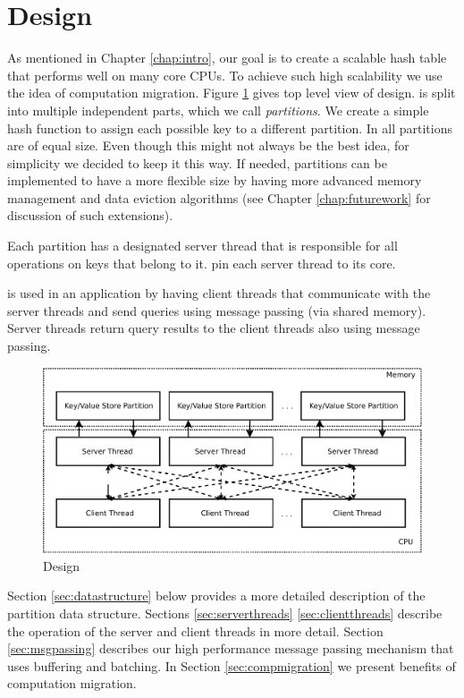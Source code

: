 \section{\cphash{} Design}
\label{chap:mcstore}

As mentioned in Chapter \ref{chap:intro}, our goal is to create a scalable hash table 
that performs well on many core CPUs. To achieve such high scalability we use the idea of 
computation migration. Figure \ref{fig:mcstore} gives top level view of \cphash{} design. 
\cphash{} is split into multiple independent parts, which we call \textit{partitions}. We create a simple 
hash function to assign each possible key to a different partition. In \cphash{} all partitions are of equal size. Even though 
this might not always be the best idea, for simplicity we decided to keep it this way. 
If needed, partitions can be implemented to have a more flexible size by having more advanced 
memory management and data eviction algorithms (see Chapter \ref{chap:futurework} for discussion of such extensions).

Each partition has a designated server thread that is responsible for all operations 
on keys that belong to it. \cphash{} pin each server thread to its core.

\cphash{} is used in an application by having client threads that communicate with the server threads
and send queries using message passing (via shared memory). Server threads return query results
to the client threads also using message passing.  

\begin{figure}[!ht]
  \centering
  \includegraphics[width=\linewidth]{figs/mcstore.pdf}
  \caption{\cphash{} Design}
  \label{fig:mcstore}
\end{figure}

  
Section \ref{sec:datastructure} below provides a more detailed description of the partition data structure. 
Sections \ref{sec:serverthreads} \ref{sec:clientthreads} describe the operation of the server and client threads in more detail. 
Section \ref{sec:msgpassing} describes our high performance message passing mechanism that uses buffering and batching. 
In Section \ref{sec:compmigration} we present benefits of computation migration. 

